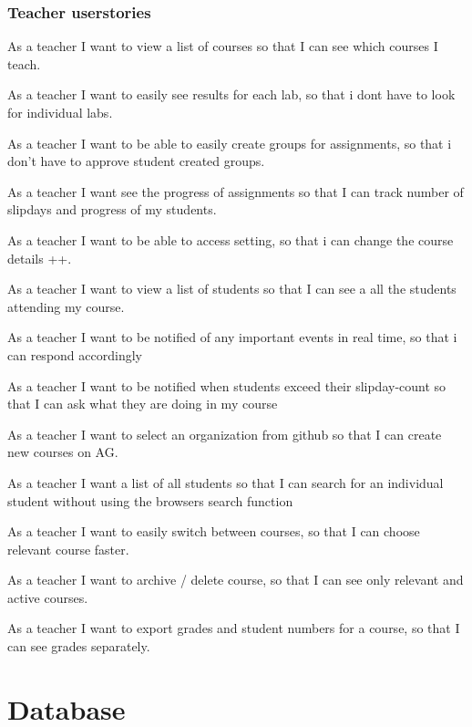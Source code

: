 \begin{appendices}
\begin{itemize*}
\subsection*{Teacher userstories}
\item As a teacher I want to view a list of courses so that I can see which courses I teach.
\item As a teacher I want to easily see results for each lab, so that i dont have to look for individual labs.
\item As a teacher I want to be able to easily create groups for assignments, so that i don't have to approve student created groups.
\item As a teacher I want see the progress of assignments so that I can track number of slipdays and progress of my students.
\item As a teacher I want to be able to access setting, so that i can change the course details ++.
\item As a teacher I want to view a list of students so that I can see a all the students attending my course.
\item As a teacher I want to be notified of any important events in real time, so that i can respond accordingly
\item As a teacher I want to be notified when students exceed their slipday-count so that I can ask what they are doing in my course
\item As a teacher I want to select an organization from github so that I can create new courses on AG.
\item As a teacher I want a list of all students so that I can search for an individual student without using the browsers search function
\item As a teacher I want to easily switch between courses, so that I can choose relevant course faster.
\item As a teacher I want to archive / delete course, so that I can see only relevant and active courses.
\item As a teacher I want to export grades and student numbers for a course, so that I can see grades separately.
\end{itemize*}

\chapter{Database}\label{app:database}

\end{appendices}

